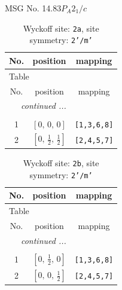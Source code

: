 \documentclass[fleqn,8pt]{jsarticle}
\begin{document}
\setcounter{MaxMatrixCols}{32}

\renewcommand{\tablename}{Table~}
\renewcommand{\figurename}{Figure~}
\begin{center}
\LARGE
MSG No. 14.83\quad$P_{A}2_{1}/c$
\end{center}
\renewcommand{\arraystretch}{1.2}
\begin{longtable}{ccc}
\caption{Wyckoff site: {\tt 2a}, site symmetry: {\tt 2'/m'}}
 \\
 \hline \hline
No. & position & mapping \\ \hline \endfirsthead

\multicolumn{2}{l}{\tablename\ \thetable{}} \\
 \hline \hline
No. & position & mapping \\ \hline \endhead

 \hline \hline
\multicolumn{2}{r}{\footnotesize\it continued ...} \\ \endfoot

 \hline \hline
\multicolumn{2}{r}{} \\ \endlastfoot

1 & $\left[ 0,\, 0,\, 0 \right]$ & {\tt [1,3,6,8]} \\ \hline
2 & $\left[ 0,\, \frac{1}{2},\, \frac{1}{2} \right]$ & {\tt [2,4,5,7]} \\
\end{longtable}
\renewcommand{\arraystretch}{1.2}
\begin{longtable}{ccc}
\caption{Wyckoff site: {\tt 2b}, site symmetry: {\tt 2'/m'}}
 \\
 \hline \hline
No. & position & mapping \\ \hline \endfirsthead

\multicolumn{2}{l}{\tablename\ \thetable{}} \\
 \hline \hline
No. & position & mapping \\ \hline \endhead

 \hline \hline
\multicolumn{2}{r}{\footnotesize\it continued ...} \\ \endfoot

 \hline \hline
\multicolumn{2}{r}{} \\ \endlastfoot

1 & $\left[ 0,\, \frac{1}{2},\, 0 \right]$ & {\tt [1,3,6,8]} \\ \hline
2 & $\left[ 0,\, 0,\, \frac{1}{2} \right]$ & {\tt [2,4,5,7]} \\
\end{longtable}
\renewcommand{\arraystretch}{1.2}
\end{document}
